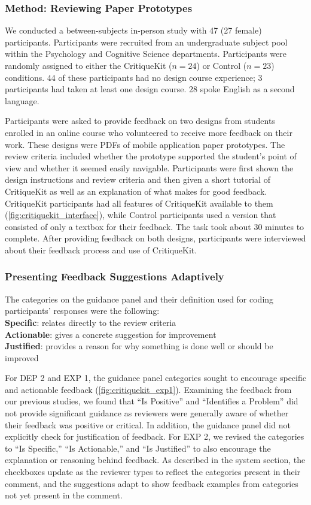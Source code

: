 \subsubsection{Method: Reviewing Paper Prototypes}
We conducted a between-subjects in-person study with 47 (27 female) participants. Participants were recruited from an undergraduate subject pool within the Psychology and Cognitive Science departments. Participants were randomly assigned to either the CritiqueKit ($n = 24$) or Control ($n = 23$) conditions. 44 of these participants had no design course experience; 3 participants had taken at least one design course. 28 spoke English as a second language. 

Participants were asked to provide feedback on two designs from students enrolled in an online course who volunteered to receive more feedback on their work. These designs were PDFs of mobile application paper prototypes. The review criteria included whether the prototype supported the student's point of view and whether it seemed easily navigable. Participants were first shown the design instructions and review criteria and then given a short tutorial of CritiqueKit as well as an explanation of what makes for good feedback. CritiqueKit participants had all features of CritiqueKit available to them (\autoref{fig:critiquekit_interface}), while Control participants used a version that consisted of only a textbox for their feedback. The task took about 30 minutes to complete. After providing feedback on both designs, participants were interviewed about their feedback process and use of CritiqueKit. 

\subsubsection{Presenting Feedback Suggestions Adaptively}
The categories on the guidance panel and their definition used for coding participants' responses were the following:\\
\textbf{Specific}: relates directly to the review criteria\\
\textbf{Actionable}: gives a concrete suggestion for improvement\\
\textbf{Justified}: provides a reason for why something is done well or should be improved

For DEP 2 and EXP 1, the guidance panel categories sought to encourage specific and actionable feedback (\autoref{fig:critiquekit_exp1}). Examining the feedback from our previous studies, we found that ``Is Positive'' and ``Identifies a Problem'' did not provide significant guidance as reviewers were generally aware of whether their feedback was positive or critical. In addition, the guidance panel did not explicitly check for justification of feedback. For EXP 2, we revised the categories to ``Is Specific,'' ``Is Actionable,'' and ``Is Justified'' to also encourage the explanation or reasoning behind feedback. As described in the system section, the checkboxes update as the reviewer types to reflect the categories present in their comment, and the suggestions adapt to show feedback examples from categories not yet present in the comment. 

